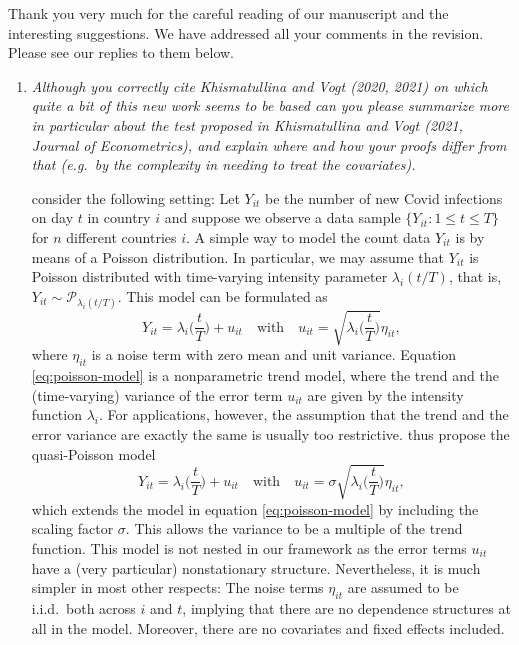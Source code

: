 \documentclass[a4paper,12pt]{article}
\begin{document}
Thank you very much for the careful reading of our manuscript and the interesting suggestions. We have addressed all your comments in the revision. Please see our replies to them below.
\begin{enumerate}[label=\arabic*.,leftmargin=0.6cm]

  
\item \textit{Although you correctly cite Khismatullina and Vogt (2020, 2021) on which quite a bit of this new work seems to be based can you please summarize more in particular about the test proposed in Khismatullina and Vogt (2021, Journal of Econometrics), and explain where and how your proofs differ from that (e.g.\ by the complexity in needing to treat the covariates).}

\cite{KhismatullinaVogt2023} consider the following setting: Let $Y_{it}$ be the number of new Covid infections on day $t$ in country $i$ and suppose we observe a data sample $\{Y_{it}: 1 \le t \le T \}$ for $n$ different countries $i$. A simple way to model the count data $Y_{it}$ is by means of a Poisson distribution. In particular, we may assume that $Y_{it}$ is Poisson distributed with time-varying intensity parameter $\lambda_i(t/T)$, that is, $Y_{it} \sim \mathcal{P}_{\lambda_i(t/T)}$. This model can be formulated as
\begin{equation}\label{eq:poisson-model}
Y_{it} = \lambda_i\Big(\frac{t}{T}\Big) + u_{it} \quad \text{with} \quad u_{it} = \sqrt{ \lambda_i\Big(\frac{t}{T}\Big) } \eta_{it}, 
\end{equation}
where $\eta_{it}$ is a noise term with zero mean and unit variance. Equation \eqref{eq:poisson-model} is a nonparametric trend model, where the trend and the (time-varying) variance of the error term $u_{it}$ are given by the intensity function $\lambda_i$. For applications, however, the assumption that the trend and the error variance are exactly the same is usually too restrictive. \cite{KhismatullinaVogt2023} thus propose the quasi-Poisson model 
\begin{equation}\label{eq:quasi-poisson-model}
Y_{it} = \lambda_i\Big(\frac{t}{T}\Big) + u_{it} \quad \text{with} \quad u_{it} = \sigma \sqrt{ \lambda_i\Big(\frac{t}{T}\Big) } \eta_{it}, 
\end{equation}
which extends the model in equation \eqref{eq:poisson-model} by including the scaling factor $\sigma$. This allows the variance to be a multiple of the trend function. This model is not nested in our framework as the error terms $u_{it}$ have a (very particular) nonstationary structure. Nevertheless, it is much simpler in most other respects: The noise terms $\eta_{it}$ are assumed to be i.i.d.\ both across $i$ and $t$, implying that there are no dependence structures at all in the model. Moreover, there are no covariates and fixed effects included. \\

\end{enumerate}
\end{document}
